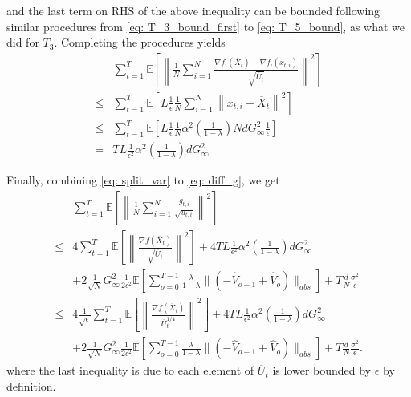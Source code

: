 \documentclass{article} %
\begin{document}
and the last term on RHS of the above inequality can be bounded following similar procedures from \eqref{eq: T_3_bound_first} to \eqref{eq: T_5_bound}, as what we did for $T_3$. Completing the procedures yields
\begin{align}\label{eq: diff_g}
&\sum_{t=1}^T \mathbb E \left[  \left\|\frac{1}{N} \sum_{i=1}^N \frac{\nabla f_i(\overline X_t) - \nabla f_i(x_{t,i})}{\sqrt{\overline U_t}  } \right\|^2 \right] \nonumber \\
\leq & \sum_{t=1}^T \mathbb E \left [ L \frac{1}{\epsilon} \frac{1}{N} \sum_{i=1}^N \left\|x_{t,i} - \overline X_t \right\|^2 \right] \nonumber \\
\leq & \sum_{t=1}^T \mathbb E \left [ L \frac{1}{\epsilon} \frac{1}{N} \alpha^2 \left( \frac{1}{1-\lambda}\right)Nd G_{\infty}^2 \frac{1}{\epsilon} \right] \nonumber \\
= & T L \frac{1}{\epsilon^2}  \alpha^2 \left( \frac{1}{1-\lambda}\right)d G_{\infty}^2 
\end{align}

Finally, combining \eqref{eq: split_var} to \eqref{eq: diff_g}, we get
\begin{align}
& \sum_{t=1}^T \mathbb E\left[ \left\| \frac{1}{N} \sum_{i=1}^N \frac{g_{t,i}}{\sqrt{u_{t,i}}} \right\|^2 \right] \nonumber  \\
\leq &  4 \sum_{t=1}^T \mathbb E \left[  \left\| \frac{\nabla f(\overline X_{t})}{\sqrt{\overline U_t}  } \right\|^2 \right] + 4 T L \frac{1}{\epsilon^2}  \alpha^2 \left( \frac{1}{1-\lambda}\right)d G_{\infty}^2 \nonumber \\
& +  2\frac{1}{\sqrt{N}}  G_{\infty}^2 \frac{1}{2\epsilon^2}   \mathbb E \left[   \sum_{o=0}^{T-1} \frac{\lambda}{1-\lambda}     \|    (- \hat V_{o-1} + \hat V_{o} ) \|_{abs}    \right]  + T \frac{d}{N}
\frac{ \sigma^2 }{\epsilon} \nonumber \\
\leq &  4 \frac{1}{\sqrt{\epsilon}} \sum_{t=1}^T \mathbb E \left[  \left\| \frac{\nabla f(\overline X_{t})}{\overline U_t^{1/4}  } \right\|^2 \right] + 4 T L \frac{1}{\epsilon^2}  \alpha^2 \left( \frac{1}{1-\lambda}\right)d G_{\infty}^2 \nonumber \\
& +  2\frac{1}{\sqrt{N}}  G_{\infty}^2 \frac{1}{2\epsilon^2}   \mathbb E \left[   \sum_{o=0}^{T-1} \frac{\lambda}{1-\lambda}     \|    (- \hat V_{o-1} + \hat V_{o} ) \|_{abs}    \right]  + T \frac{d}{N}
\frac{ \sigma^2 }{\epsilon}.
\end{align}
where the last inequality is due to each element of $\overline U_t$ is lower bounded by $\epsilon$ by definition.
\end{document}
